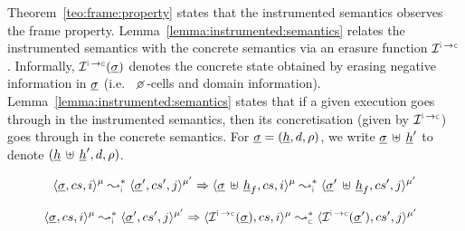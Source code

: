 


Theorem~\ref{teo:frame:property} states that the \jsil instrumented semantics observes the 
frame property. Lemma~\ref{lemma:instrumented:semantics} relates the instrumented 
semantics with the concrete semantics via an erasure function  $\interpret{\instconc}{}$. Informally, $\interpret{\instconc}{}(\istate)$
denotes the concrete state obtained by erasing negative information in $\underline{\sigma}$ (i.e.~  
$\none$-cells and domain information). 
Lemma~\ref{lemma:instrumented:semantics} states that if a given execution 
goes through in the instrumented semantics, then its concretisation (given by $\interpret{\instconc}{}$) 
goes through in the concrete semantics. %
For $\underline{\sigma} = (\underline{h}, d, \rho)$, we write $\underline{\sigma} \, \uplus \, \underline{h}'$ to denote $(\underline{h} \, \uplus \, \underline{h}', d, \rho)$.

\begin{theorem}\label{teo:frame:property}
\hspace*{-0.28cm}$$
\transabssemrule{\istate, \cs, i}{\istate', \cs', j}{\mode}{\mode'}{\instrumented}\Rightarrow
        \transabssemrule{\istate \dunion \iheap_f, \cs, i}{\istate' \dunion \iheap_f, \cs', j}{\mode}{\mode'}{\instrumented} 
$$
\end{theorem}

\begin{lemma}\label{lemma:instrumented:semantics}
$$
\hspace*{-0.22cm}
\transabssemrule{\istate, \cs, i}{\istate', \cs', j}{\mode}{\mode'}{\instrumented} \Rightarrow \transabssemrule{\interpret{\instconc}{}(\istate), \cs, i}{\interpret{\instconc}{}(\istate'), \cs', j}{\mode}{\mode'}{\concrete} 
$$
\end{lemma}



